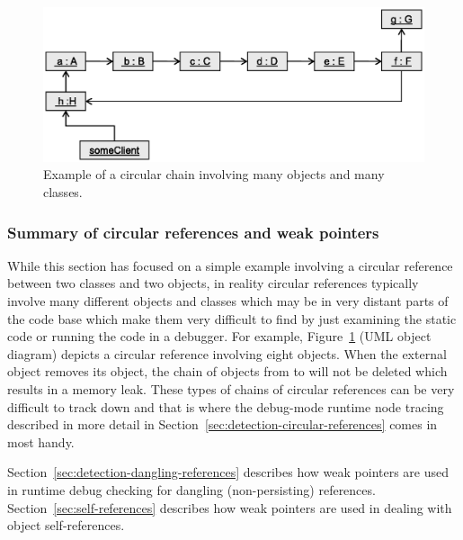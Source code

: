 \documentclass[pdf,ps2pdf,11pt]{SANDreport}
\begin{document}
{\bsinglespace
\begin{figure}
\begin{center}
\includegraphics*[angle=0,scale=0.65]{CircularChain}
\end{center}
\caption{
\label{fig:CircularChain}
Example of a circular chain involving many objects and many classes.}
\end{figure}
\esinglespace}


%
{}\subsubsection*{Summary of circular references and weak pointers}
%

While this section has focused on a simple example involving a
circular reference between two classes and two objects, in reality
circular references typically involve many different objects and
classes which may be in very distant parts of the code base which make
them very difficult to find by just examining the static code or
running the code in a debugger.  For example,
Figure~\ref{fig:CircularChain} (UML object diagram) depicts a circular
reference involving eight objects.  When the external
{} object removes its {} object, the chain
of objects from {} to {} will not be deleted which
results in a memory leak.  These types of chains of circular
references can be very difficult to track down and that is where the
debug-mode runtime node tracing described in more detail in
Section~\ref{sec:detection-circular-references} comes in most handy.

Section~\ref{sec:detection-dangling-references} describes how weak
pointers are used in runtime debug checking for dangling
(non-persisting) references.  Section~\ref{sec:self-references}
describes how weak pointers are used in dealing with object
self-references.
\end{document}
